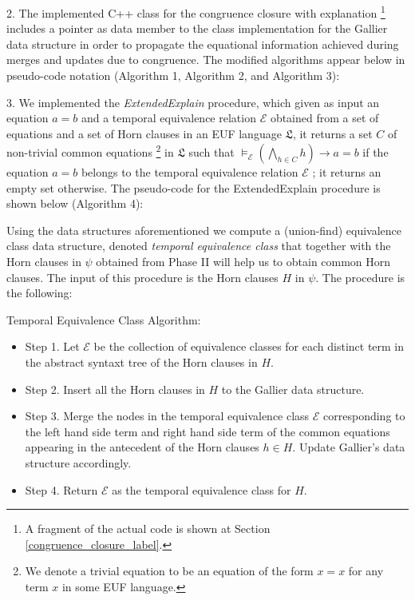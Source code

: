 2. The implemented C++ class for 
the congruence closure with explanation 
\footnote{
  A fragment of the actual code is shown
  at Section \ref{congruence_closure_label}.
} 
includes a pointer as data member to the 
class implementation
for the Gallier data structure in order to propagate 
the equational information achieved during
merges and updates due to congruence. The modified 
algorithms appear below in pseudo-code notation (Algorithm 1, Algorithm 2, and Algorithm 3):





3. We implemented the \emph{ExtendedExplain}
procedure, which given as input an equation $a = b$ 
and a temporal equivalence relation 
$\mathcal{E}$ obtained from a set of equations 
and a set of Horn clauses in an EUF language 
$\mathfrak{L}$, it returns a set $C$ of non-trivial 
common equations \footnote{We denote a trivial equation to be an 
equation of the form $x = x$ for any term $x$ in some EUF
language.} in $\mathfrak{L}$
such that
$\models_{\mathcal{E}} (\bigwedge_{h \in C} h) 
\rightarrow a = b$ if the equation $a = b$ 
belongs to the 
temporal equivalence relation $\mathcal{E}$ ; 
it returns an empty set otherwise. 
The pseudo-code
for the ExtendedExplain procedure is shown 
below (Algorithm 4):



Using the data structures aforementioned 
we compute a (union-find) equivalence class 
data structure, denoted \emph{temporal equivalence
class}
that together with the Horn clauses in $\psi$
obtained from Phase II
will help us to obtain common Horn clauses.
The input of this procedure is the Horn clauses $H$
in $\psi$. The procedure is the following:

Temporal Equivalence Class Algorithm: 
\label{ccc_algorithm} \\
\begin{itemize} 
  \item[] Step 1. Let $\mathcal{E}$ be the collection 
    of equivalence classes for each distinct term 
    in the abstract 
    syntaxt tree of 
    the Horn clauses in $H$.

  \item[] Step 2. Insert all the Horn clauses 
    in $H$ to the Gallier
    data structure.

  \item[] Step 3. Merge the nodes in the 
    temporal equivalence class $\mathcal{E}$ 
    corresponding 
    to the left hand side term 
    and right hand side term of the
    common equations appearing 
    in the antecedent of the Horn clauses 
    $h \in H$. Update Gallier's data structure
    accordingly.

  \item[] Step 4. Return $\mathcal{E}$ as the
    temporal equivalence class for $H$.
\end{itemize}

